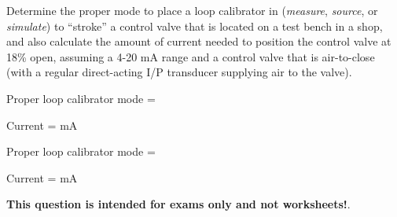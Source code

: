

Determine the proper mode to place a loop calibrator in ({\it measure}, {\it source}, or {\it simulate}) to ``stroke'' a control valve that is located on a test bench in a shop, and also calculate the amount of current needed to position the control valve at 18\% open, assuming a 4-20 mA range and a control valve that is air-to-close (with a regular direct-acting I/P transducer supplying air to the valve).

\vskip 10pt

Proper loop calibrator mode = \underbar{\hskip 50pt}

\vskip 10pt

Current = \underbar{\hskip 50pt} mA







Proper loop calibrator mode = 

Current =  mA







{\bf This question is intended for exams only and not worksheets!}.



